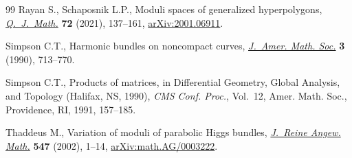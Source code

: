 \begin{thebibliography}{99}
Rayan S., Schaposnik L.P., Moduli spaces of generalized hyperpolygons,
 \href{https://doi.org/10.1093/qmath/haaa036}{\textit{Q.~J.~Math.}} \textbf{72} (2021), 137--161, \href{https://arxiv.org/abs/2001.06911}{arXiv:2001.06911}.

Simpson C.T., Harmonic bundles on noncompact curves, \href{https://doi.org/10.2307/1990935}{\textit{J.~Amer. Math.
 Soc.}} \textbf{3} (1990), 713--770.

Simpson C.T., Products of matrices, in Differential Geometry, Global Analysis,
 and Topology ({H}alifax, {NS}, 1990), \textit{CMS Conf. Proc.}, Vol.~12,
 Amer. Math. Soc., Providence, RI, 1991, 157--185.

Thaddeus M., Variation of moduli of parabolic {H}iggs bundles, \href{https://doi.org/10.1515/crll.2002.051}{\textit{J.~Reine
 Angew. Math.}} \textbf{547} (2002), 1--14, \href{https://arxiv.org/abs/math.AG/0003222}{arXiv:math.AG/0003222}.

\end{thebibliography}
